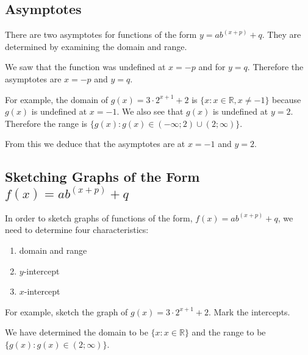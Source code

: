 
\subsection{Asymptotes}
There are two asymptotes for functions of the form $y=ab^{(x+p)} + q$. They are determined by examining the domain and range.

We saw that the function was undefined at $x=-p$ and for $y=q$. Therefore the asymptotes are $x=-p$ and $y=q$.

For example, the domain of $g(x)=3\cdot 2^{x+1} + 2$ is $\{x:x\in\mathbb{R}, x\ne-1\}$ because $g(x)$ is undefined at $x=-1$. We also see that $g(x)$ is undefined at $y=2$. Therefore the range is $\{g(x):g(x)\in(-\infty;2)\cup(2;\infty)\}$.

From this we deduce that the asymptotes are at $x=-1$ and $y=2$.


\subsection{Sketching Graphs of the Form $f(x)=ab^{(x+p)} + q$}
In order to sketch graphs of functions of the form, $f(x)=ab^{(x+p)} + q$, we need to determine four characteristics:
\begin{enumerate}
\item{domain and range}
\item{$y$-intercept}
\item{$x$-intercept}
\end{enumerate}

For example, sketch the graph of $g(x)=3\cdot 2^{x+1} + 2$. Mark the intercepts.

We have determined the domain to be $\{x:x\in\mathbb{R}\}$ and the range to be $\{g(x):g(x)\in(2;\infty)\}$.

